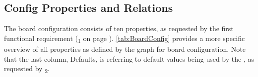 \vspace*{-1.40em}

\subsection{Config Properties and Relations}

The board configuration consists of ten properties, as requested by the first functional requirement (\textsubscript{1} on page \pageref{FR1}). \autoref{tab:BoardConfig} provides a more specific overview of all properties as defined by the graph for board configuration. Note that the last column,  Defaults, is referring to default values being used by the , as requested by \textsubscript{2}.



